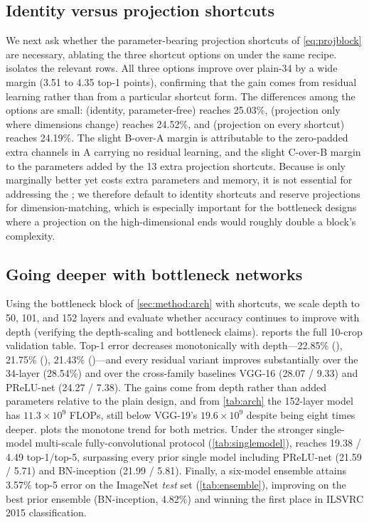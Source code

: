 \subsection{Identity versus projection shortcuts}
\label{sec:exp:shortcut}
We next ask whether the parameter-bearing projection shortcuts of \cref{eq:projblock} are
necessary, ablating the three shortcut options on  under the same recipe.
 isolates the relevant rows. All three options improve over plain-34 by
a wide margin (3.51 to 4.35 top-1 points), confirming that the gain comes from residual
learning rather than from a particular shortcut form. The differences among the options are
small: \optA{} (identity, parameter-free) reaches 25.03\%, \optB{} (projection only where
dimensions change) reaches 24.52\%, and \optC{} (projection on every shortcut) reaches
24.19\%. The slight B-over-A margin is attributable to the zero-padded extra channels in A
carrying no residual learning, and the slight C-over-B margin to the parameters added by the
13 extra projection shortcuts. Because \optC{} is only marginally better yet costs extra
parameters and memory, it is not essential for addressing the \degprob; we therefore default
to identity shortcuts and reserve projections for dimension-matching, which is especially
important for the bottleneck designs where a projection on the high-dimensional ends would
roughly double a block's complexity.

\subsection{Going deeper with bottleneck networks}
\label{sec:exp:depth}
Using the bottleneck block of \cref{sec:method:arch} with \optB{} shortcuts, we scale depth
to 50, 101, and 152 layers and evaluate whether accuracy continues to improve with depth
(verifying the depth-scaling and bottleneck claims).  reports the
full 10-crop validation table. Top-1 error decreases monotonically with depth---22.85\%
(), 21.75\% (), 21.43\% ()---and every residual variant
improves substantially over the 34-layer \plainnet (28.54\%) and over the cross-family
baselines VGG-16 (28.07 / 9.33) and PReLU-net (24.27 / 7.38). The gains come from depth
rather than added parameters relative to the plain design, and from \cref{tab:arch} the
152-layer model has $11.3\times10^{9}$ FLOPs, still below VGG-19's $19.6\times10^{9}$
despite being eight times deeper.  plots the monotone trend for both
metrics. Under the stronger single-model multi-scale fully-convolutional protocol
(\cref{tab:singlemodel}),  reaches 19.38 / 4.49 top-1/top-5, surpassing every
prior single model including PReLU-net (21.59 / 5.71) and BN-inception (21.99 / 5.81).
Finally, a six-model ensemble attains 3.57\% top-5 error on the ImageNet \emph{test} set
(\cref{tab:ensemble}), improving on the best prior ensemble (BN-inception, 4.82\%) and
winning the first place in ILSVRC 2015 classification.

